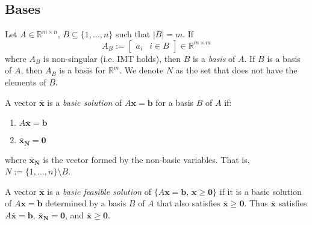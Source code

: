 \subsection{Bases}
\begin{defbox}
    \begin{definition}
        Let $A\in\mathbb{R}^{m\times n}$, $B\subseteq\{1,\dots,n\}$ such that $|B|=m$. If
        \[A_B:= \left[\begin{array}{c|c} a_i & i\in B \end{array}\right]
            \in\mathbb{R}^{m\times{}m}
        \]
        where $A_B$ is non-singular (i.e. IMT holds), then $B$ is a \emph{basis} of $A$.
        If $B$ is a basis of $A$, then $A_B$ is a basis for $\mathbb{R}^m$. We
        denote $N$ as the set that does not have the elements of $B$.
    \end{definition}
\end{defbox}

\begin{defbox}
    \begin{definition}
        A vector $\bm{\bar{x}}$ is a \emph{basic solution} of $ A \bm{x}=\bm{b} $
        for a basis $ B $ of $ A $ if:
        \begin{enumerate}[label=(\arabic*)]
            \item $A \bm{\bar{x}}=\bm{b}$
            \item $\bm{\bar{x}_N}=\bm{0}$
        \end{enumerate}
        where $ \bm{\bar{x}_N} $ is the vector formed by the non-basic variables.
        That is, $ N:=\{1,\ldots,n\}\setminus B $.
    \end{definition}
\end{defbox}

\begin{defbox}
    \begin{definition}
        A vector $\bm{\bar{x}}$ is a \emph{basic feasible solution} of
        $ \{A \bm{x}=\bm{b},\, \bm{x}\geqslant  \bm{0}\} $ if it is a basic solution
        of $ A\bm{x}=\bm{b}$ determined by a basis $ B $ of $ A $ that also
        satisfies $\bm{\bar{x}}\geqslant  \bm{0}$. Thus $ \bm{\bar{x}} $ satisfies
        $ A \bm{\bar{x}}=\bm{b} $, $ \bm{\bar{x}_N}=\bm{0} $, and $ \bm{\bar{x}}\geqslant  \bm{0} $.
    \end{definition}
\end{defbox}


